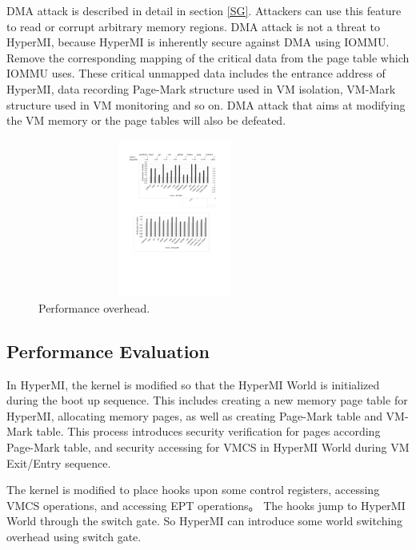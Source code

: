 \documentclass[conference]{IEEEtran}
\begin{document}
 DMA attack is described in detail in section \ref{SG}. Attackers can use this feature to read or corrupt arbitrary memory regions. DMA attack is not a threat to HyperMI, because HyperMI is inherently secure against DMA using IOMMU. Remove the corresponding mapping of the critical data from the page table which IOMMU uses. These critical unmapped data includes the entrance address of HyperMI, data recording Page-Mark structure used in VM isolation, VM-Mark structure used in VM monitoring and so on. DMA attack that aims at modifying the VM memory or the page tables will also be defeated.

\begin{figure}
\centerline{\includegraphics[width=9cm,height=5.2cm]{performance.pdf}}
\caption{Performance overhead.} \label{fig5}
\end{figure}

\subsection{Performance Evaluation}

In HyperMI, the kernel is modified so that the HyperMI World is initialized during the boot up sequence. This includes creating a new memory page table for HyperMI, allocating memory pages, as well as creating Page-Mark table and VM-Mark table. This process introduces security verification for pages according Page-Mark table, and security accessing for VMCS in HyperMI World during VM Exit/Entry sequence.

The kernel is modified to place hooks upon some control registers, accessing VMCS operations, and accessing EPT operations。
 The hooks jump to HyperMI World through the switch gate. So HyperMI can introduce some world switching overhead using switch gate.
\end{document}
